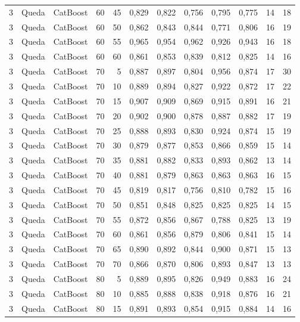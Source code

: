\begin{longtable}{@{}rllrrrrrrrrr@{}}
3 & Queda & CatBoost & 60 & 45 & 0,829 & 0,822 & 0,756 & 0,795 & 0,775 & 14 & 18 \\
3 & Queda & CatBoost & 60 & 50 & 0,862 & 0,843 & 0,844 & 0,771 & 0,806 & 16 & 19 \\
3 & Queda & CatBoost & 60 & 55 & 0,965 & 0,954 & 0,962 & 0,926 & 0,943 & 16 & 18 \\
3 & Queda & CatBoost & 60 & 60 & 0,861 & 0,853 & 0,839 & 0,812 & 0,825 & 14 & 16 \\
3 & Queda & CatBoost & 70 & 5 & 0,887 & 0,897 & 0,804 & 0,956 & 0,874 & 17 & 30 \\
3 & Queda & CatBoost & 70 & 10 & 0,889 & 0,894 & 0,827 & 0,922 & 0,872 & 17 & 22 \\
3 & Queda & CatBoost & 70 & 15 & 0,907 & 0,909 & 0,869 & 0,915 & 0,891 & 16 & 21 \\
3 & Queda & CatBoost & 70 & 20 & 0,902 & 0,900 & 0,878 & 0,887 & 0,882 & 17 & 19 \\
3 & Queda & CatBoost & 70 & 25 & 0,888 & 0,893 & 0,830 & 0,924 & 0,874 & 15 & 19 \\
3 & Queda & CatBoost & 70 & 30 & 0,879 & 0,877 & 0,853 & 0,866 & 0,859 & 15 & 14 \\
3 & Queda & CatBoost & 70 & 35 & 0,881 & 0,882 & 0,833 & 0,893 & 0,862 & 13 & 14 \\
3 & Queda & CatBoost & 70 & 40 & 0,881 & 0,879 & 0,863 & 0,863 & 0,863 & 16 & 15 \\
3 & Queda & CatBoost & 70 & 45 & 0,819 & 0,817 & 0,756 & 0,810 & 0,782 & 15 & 16 \\
3 & Queda & CatBoost & 70 & 50 & 0,851 & 0,848 & 0,825 & 0,825 & 0,825 & 14 & 15 \\
3 & Queda & CatBoost & 70 & 55 & 0,872 & 0,856 & 0,867 & 0,788 & 0,825 & 13 & 19 \\
3 & Queda & CatBoost & 70 & 60 & 0,861 & 0,856 & 0,879 & 0,806 & 0,841 & 15 & 14 \\
3 & Queda & CatBoost & 70 & 65 & 0,890 & 0,892 & 0,844 & 0,900 & 0,871 & 15 & 13 \\
3 & Queda & CatBoost & 70 & 70 & 0,866 & 0,870 & 0,806 & 0,893 & 0,847 & 13 & 13 \\
3 & Queda & CatBoost & 80 & 5 & 0,889 & 0,895 & 0,826 & 0,949 & 0,883 & 16 & 24 \\
3 & Queda & CatBoost & 80 & 10 & 0,885 & 0,888 & 0,838 & 0,918 & 0,876 & 16 & 21 \\
3 & Queda & CatBoost & 80 & 15 & 0,891 & 0,893 & 0,854 & 0,915 & 0,884 & 14 & 16 \\

\end{longtable}
